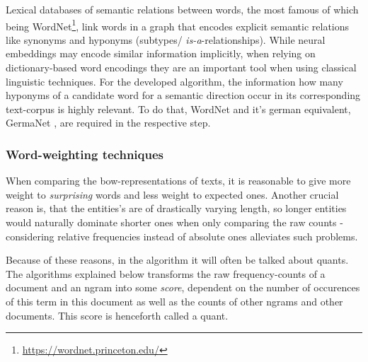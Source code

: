 Lexical databases of semantic relations between words, the most famous of which being WordNet\footnote{\url{https://wordnet.princeton.edu/}}, link words in a graph that encodes explicit semantic relations like synonyms and hyponyms (subtypes/ \emph{is-a}-relationships). While neural %
embeddings may encode similar information implicitly, when relying on dictionary-based word encodings they are an important tool when using classical linguistic techniques. For the developed algorithm, the information how many hyponyms of a candidate word for a semantic direction %
occur in its corresponding text-corpus is highly relevant. To do that, WordNet \cite{Miller1995} and it's german equivalent, GermaNet \cite{hamp-feldweg-1997-germanet,Henrich}, are required in the respective step.


\subsubsection*{Word-weighting techniques}

\label{sec:word_count_techniques}

When comparing the \gls{bow}-representations of texts, it is reasonable to give more weight to \emph{surprising} words and less weight to expected ones.  \cite[156]{Turney2010} 
Another crucial reason is, that the entities's are of drastically varying length, so longer entities would naturally dominate shorter ones when only comparing the raw counts - considering relative frequencies instead of absolute ones alleviates such problems.

Because of these reasons, in the algorithm it will often be talked about \glspl{quant}. The algorithms explained below transforms the raw frequency-counts of a document and an \gls{ngram} into some \emph{score}, dependent on the number of occurences of this term in this document as well as the counts of other \glspl{ngram} and other documents. This score is henceforth called a \gls{quant}.



